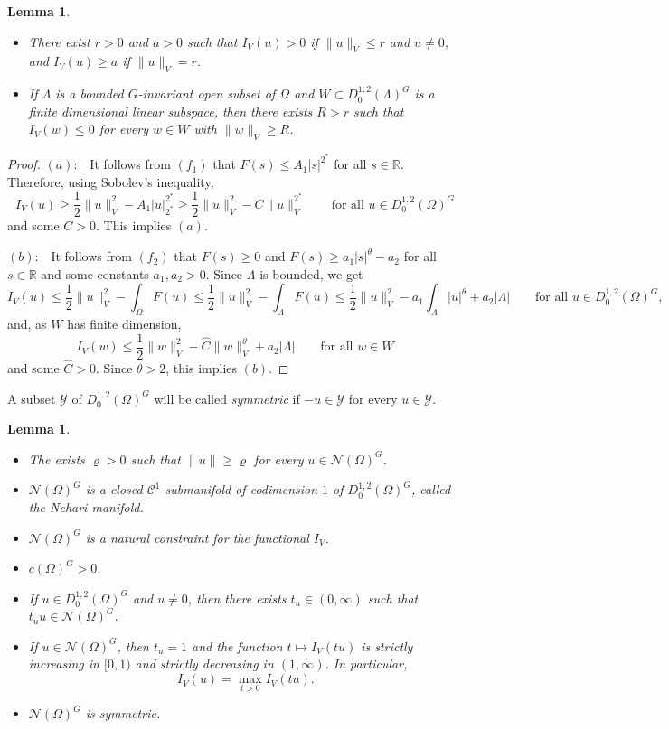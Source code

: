 \documentclass[10pt,letterpaper]{article}
\newtheorem{lemma}[theorem]{Lemma}
\numberwithin{equation}{section}
\def\r{\mathbb{R}}
\def\io{\int_{\Omega}}
\def\vr{\varrho}
\def\o{\Omega}
\def\cC{\mathcal{C}}
\def\cN{\mathcal{N}}
\def\cY{\mathcal{Y}}
\def\what{\widehat}
\begin{document}
\begin{lemma}\label{lem:mountain pass}
\begin{itemize}
\item[$(a)$] There exist $r>0$ and $a>0$ such that $I_V(u)>0$ if $\|u\|_V\leq r$ and $u\neq 0$, and $I_V(u)\geq a$ if $\|u\|_V=r$.
\item[$(b)$] If $\Lambda$ is a bounded $G$-invariant open subset of $\o$ and $W\subset D^{1,2}_0(\Lambda)^G$ is a finite dimensional linear subspace, then there exists $R>r$ such that $I_V(w)\leq 0$ for every $w\in W$ with $\|w\|_V\geq R$.
\end{itemize}
\end{lemma}

\begin{proof}
$(a):$ \ It follows from $(f_1)$ that $F(s)\leq A_1|s|^{2^*}$ for all $s\in \r$. Therefore, using Sobolev's inequality,
$$I_V(u)\geq\frac{1}{2}\|u\|_V^2-A_1|u|_{2^*}^{2^*}\geq\frac{1}{2}\|u\|_V^2-C\|u\|_V^{2^*}\qquad\text{for all \ }u\in D^{1,2}_0(\o)^G$$
and some $C>0$. This implies $(a)$.

$(b):$ \ It follows from $(f_2)$ that $F(s)\geq 0$ and $F(s)\geq a_1|s|^\theta-a_2$ for all $s\in \r$ and some constants $a_1,a_2>0$. Since $\Lambda$ is bounded, we get
$$I_V(u)\leq\frac{1}{2}\|u\|_V^2-\io F(u)\leq\frac{1}{2}\|u\|_V^2-\int_{\Lambda} F(u)\leq\frac{1}{2}\|u\|_V^2-a_1\int_{\Lambda}|u|^\theta+a_2|\Lambda|\qquad\text{for all \ }u\in D^{1,2}_0(\o)^G,$$
and, as $W$ has finite dimension, 
$$I_V(w)\leq \frac{1}{2}\|w\|_V^2-\what C\|w\|_V^\theta+a_2|\Lambda|\qquad\text{for all \ }w\in W$$
and some $\what C>0$. Since $\theta>2$, this implies $(b)$.
\end{proof}

A subset $\cY$ of $D^{1,2}_0(\o)^G$ will be called \emph{symmetric} if $-u\in\cY$ for every $u\in\cY$.

\begin{lemma}\label{lem:nehari}
\begin{itemize} 
\item [$(i)$] The exists $\vr>0$ such that $\| u\| \geq \vr$ for every $u\in\cN(\o)^G$.
\item [$(ii)$] $\cN(\o)^G$ is a closed $\cC^1$-submanifold of codimension $1$ of $D^{1,2}_0(\o)^G$, called the \emph{Nehari manifold}.
\item [$(iii)$] $\cN(\o)^G$ is a natural constraint for the functional $I_V$.
\item [$(iv)$] $c(\o)^G>0$.
\item[$(v)$] If $u\in D^{1,2}_0(\o)^G$ and $u\neq 0$, then there exists $t_u\in(0,\infty)$ such that $t_uu\in \cN(\o)^G$.
\item[$(vi)$] If $u \in\cN(\o)^G$, then $t_u=1$ and the function $t \mapsto I_V(tu) $ is strictly increasing in $[0,1)$ and strictly decreasing in $(1,\infty)$. In particular,
$$I_V(u)= \max_{t>0} I_V(tu).$$
\item[$(vii)$] $\cN(\o)^G$ is symmetric.
\end{itemize}
\end{lemma}
\end{document}
